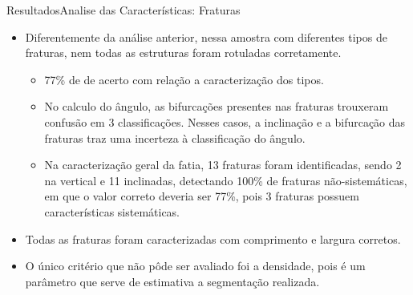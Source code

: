 \documentclass{beamer}
\begin{document}
\begin{frame}{Resultados}{Analise das Características: Fraturas}

\begin{itemize}
    \item Diferentemente da análise anterior, nessa amostra com diferentes tipos de fraturas, nem todas as estruturas foram rotuladas corretamente.
   \begin{itemize}
        \item 77\% de de acerto com relação a caracterização dos tipos.
        \item No calculo do ângulo, as bifurcações presentes nas fraturas trouxeram confusão em 3 classificações. Nesses casos, a inclinação e a bifurcação das fraturas traz uma incerteza à classificação do ângulo.
        \item Na caracterização geral da fatia, 13 fraturas foram identificadas, sendo 2 na vertical e 11 inclinadas, detectando 100\% de fraturas não-sistemáticas, em que o valor correto deveria ser 77\%, pois 3 fraturas possuem características sistemáticas.
   \end{itemize}
   
    \item Todas as fraturas foram caracterizadas com comprimento e largura corretos. 
    \item O único critério que não pôde ser avaliado foi a densidade, pois é um parâmetro que serve de estimativa a segmentação realizada.
\end{itemize}    

\end{frame}
\end{document}
